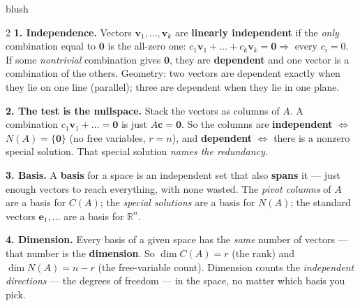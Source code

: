 \documentclass[10pt]{article}
\newcommand{\vv}{\mathbf{v}}
\newcommand{\cc}{\mathbf{c}}
\newcommand{\zero}{\mathbf{0}}
\begin{document}
\begin{skillbox}[Lesson]{blush}
\begin{multicols}{2}
\textbf{1. Independence.} Vectors $\vv_1,\dots,\vv_k$ are \textbf{linearly independent} if the \emph{only}
combination equal to $\zero$ is the all-zero one: $c_1\vv_1+\dots+c_k\vv_k=\zero\Rightarrow$ every
$c_i=0$. If some \emph{nontrivial} combination gives $\zero$, they are \textbf{dependent} and one vector
is a combination of the others. Geometry: two vectors are dependent exactly when they lie on one line
(parallel); three are dependent when they lie in one plane.

\textbf{2. The test is the nullspace.} Stack the vectors as columns of $A$. A combination
$c_1\vv_1+\dots=\zero$ is just $A\cc=\zero$. So the columns are \textbf{independent} $\Leftrightarrow$
$N(A)=\{\zero\}$ (no free variables, $r=n$), and \textbf{dependent} $\Leftrightarrow$ there is a nonzero
special solution. That special solution \emph{names the redundancy}.

\columnbreak

\textbf{3. Basis.} A \textbf{basis} for a space is an independent set that also \textbf{spans} it --- just
enough vectors to reach everything, with none wasted. The \emph{pivot columns} of $A$ are a basis for
$C(A)$; the \emph{special solutions} are a basis for $N(A)$; the standard vectors $\mathbf{e}_1,\dots$ are
a basis for $\mathbb{R}^n$.

\textbf{4. Dimension.} Every basis of a given space has the \emph{same} number of vectors --- that number
is the \textbf{dimension}. So $\dim C(A)=r$ (the rank) and $\dim N(A)=n-r$ (the free-variable count).
Dimension counts the \emph{independent directions} --- the degrees of freedom --- in the space, no matter
which basis you pick.
\end{multicols}
\end{skillbox}
\end{document}
